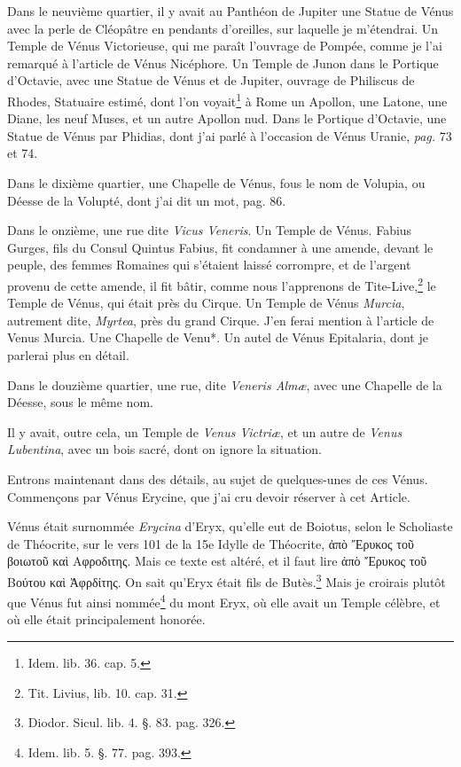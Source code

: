 \documentclass[a4paper, 11pt, oneside, polutonikogreek, french]{article}
\begin{document}
Dans le neuvième quartier, il y avait au Panthéon de Jupiter une Statue de Vénus avec la perle de Cléopâtre en pendants d'oreilles, sur laquelle je m'étendrai. Un Temple de Vénus Victorieuse, qui me paraît l'ouvrage de Pompée, comme je l'ai remarqué à l'article de Vénus Nicéphore. Un Temple de Junon dans le Portique d'Octavie, avec une Statue de Vénus et de Jupiter, ouvrage de Philiscus de Rhodes, Statuaire estimé, dont l'on voyait\footnote{Idem. lib. 36. cap. 5.} à Rome un Apollon, une Latone, une Diane, les neuf Muses, et un autre Apollon nud. Dans le Portique d'Octavie, une Statue de Vénus par Phidias, dont j'ai parlé à l'occasion de Vénus Uranie, \emph{pag.} 73 et 74.

Dans le dixième quartier, une Chapelle de Vénus, fous le nom de Volupia, ou Déesse de la Volupté, dont j'ai dit un mot, pag. 86.

Dans le onzième, une rue dite \emph{Vicus Veneris}. Un Temple de Vénus. Fabius Gurges, fils du Consul Quintus Fabius, fit condamner à une amende, devant le peuple, des femmes Romaines qui s'étaient laissé corrompre, et de l'argent provenu de cette amende, il fit bâtir, comme nous l'apprenons de Tite-Live,\footnote{Tit. Livius, lib. 10. cap. 31.} le Temple de Vénus, qui était près du Cirque. Un Temple de Vénus \emph{Murcia}, autrement dite, \emph{Myrtea}, près du grand Cirque. J'en ferai mention à l'article de Venus Murcia. Une Chapelle de Venu*. Un autel de Vénus Epitalaria, dont je parlerai plus en détail.

Dans le douzième quartier, une rue, dite \emph{Veneris Almæ}, avec une Chapelle de la Déesse, sous le même nom.

Il y avait, outre cela, un Temple de \emph{Venus Victriæ}, et un autre de \emph{Venus Lubentina}, avec un bois sacré, dont on ignore la situation.

Entrons maintenant dans des détails, au sujet de quelques-unes de ces Vénus. Commençons par Vénus Erycine, que j'ai cru devoir réserver à cet Article.

Vénus était surnommée \emph{Erycina} d'Eryx, qu'elle eut de Boiotus, selon le Scholiaste de Théocrite, sur le vers 101 de la 15e Idylle de Théocrite, ἀπὸ Ἔρυκος τοῦ βοιωτοῦ καὶ Αφροδιτης. Mais ce texte est altéré, et il faut lire ἀπὸ Ἔρυκος τοῦ Βούτου καὶ Ἀφρδίτης. On sait qu'Eryx était fils de Butès.\footnote{Diodor. Sicul. lib. 4. §. 83. pag. 326.} Mais je croirais plutôt que Vénus fut ainsi nommée\footnote{Idem. lib. 5. §. 77. pag. 393.} du mont Eryx, où elle avait un Temple célèbre, et où elle était principalement honorée.
\end{document}
